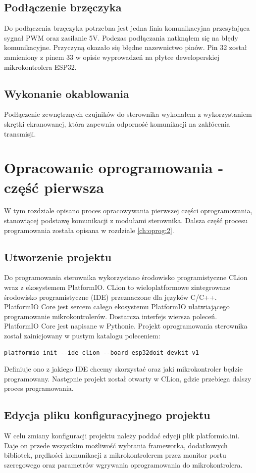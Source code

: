 \documentclass[11pt]{report}
\begin{document}
 \section{Podłączenie brzęczyka}
 Do podłączenia brzęczyka potrzebna jest jedna linia komunikacyjna przesyłająca sygnał PWM oraz zasilanie 5V. 
 Podczas podłączania natknąłem się na błędy komunikacyjne. Przyczyną okazało się błędne nazewnictwo pinów. Pin 32 został zamieniony z pinem 33 w opisie wyprowadzeń na płytce deweloperskiej mikrokontrolera ESP32.
 
 
 \section{Wykonanie okablowania}
 Podłączenie zewnętrznych czujników do sterownika wykonałem z wykorzystaniem skrętki ekranowanej, która zapewnia odporność komunikacji na zakłócenia transmisji.
 
 
 \chapter{Opracowanie oprogramowania - część pierwsza}\label{ch:oprog:1}
 W tym rozdziale opisano proces opracowywania pierwszej części oprogramowania, stanowiącej podstawę komunikacji z modułami sterownika. Dalsza część procesu programowania została opisana w rozdziale \ref{ch:oprog:2}.
 
 \section{Utworzenie projektu}
 Do programowania sterownika wykorzystano środowisko programistyczne CLion wraz z ekosystemem PlatformIO.
 CLion to wieloplatformowe zintegrowane środowisko programistyczne (IDE) przeznaczone dla języków C/C++.
 PlatformIO Core jest sercem całego ekosystemu PlatformIO ułatwiającego programowanie mikrokontrolerów. Dostarcza interfejs wiersza poleceń. PlatformIO Core jest napisane w Pythonie.
 Projekt oprogramowania sterownika został zainicjowany w pustym katalogu poleceniem:
 \begin{lstlisting}
platformio init --ide clion --board esp32doit-devkit-v1 
 \end{lstlisting}
 Definiuje ono z jakiego IDE chcemy skorzystać oraz jaki mikrokontroler będzie programowany.
 Następnie projekt został otwarty w CLion, gdzie przebiega dalszy proces programowania.
 
 \section{Edycja pliku konfiguracyjnego projektu}
 W celu zmiany konfiguracji projektu należy poddać edycji plik platformio.ini. Daje on przede wszystkim możliwość wybrania frameworka, dodatkowych bibliotek, prędkości komunikacji z mikrokontrolerem przez monitor portu szeregowego oraz parametrów wgrywania oprogramowania do mikrokontrolera.
 
\end{document}

